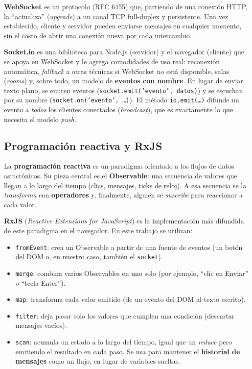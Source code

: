 \documentclass[12pt,a4paper]{article}
\begin{document}
\textbf{WebSocket} es un protocolo (RFC 6455) que, partiendo de una conexión HTTP, la ``actualiza'' (\textit{upgrade}) a un canal TCP full-duplex y persistente. Una vez establecido, cliente y servidor pueden enviarse mensajes en cualquier momento, sin el costo de abrir una conexión nueva por cada intercambio.

\textbf{Socket.io} es una biblioteca para Node.js (servidor) y el navegador (cliente) que se apoya en WebSocket y le agrega comodidades de uso real: reconexión automática, \textit{fallback} a otras técnicas si WebSocket no está disponible, salas (\textit{rooms}) y, sobre todo, un modelo de \textbf{eventos con nombre}. En lugar de enviar texto plano, se emiten eventos (\texttt{socket.emit('evento', datos)}) y se escuchan por su nombre (\texttt{socket.on('evento', \dots)}). El método \texttt{io.emit(\dots)} difunde un evento a \emph{todos} los clientes conectados (\textit{broadcast}), que es exactamente lo que necesita el modelo \textit{push}.

\subsection{Programación reactiva y RxJS}

La \textbf{programación reactiva} es un paradigma orientado a los flujos de datos asincrónicos. Su pieza central es el \textbf{Observable}: una secuencia de valores que llegan a lo largo del tiempo (clics, mensajes, ticks de reloj). A esa secuencia se la \emph{transforma} con \textbf{operadores} y, finalmente, alguien se \emph{suscribe} para reaccionar a cada valor.

\textbf{RxJS} (\textit{Reactive Extensions for JavaScript}) es la implementación más difundida de este paradigma en el navegador. En este trabajo se utilizan:
\begin{itemize}[leftmargin=1.4em]
    \item \texttt{fromEvent}: crea un Observable a partir de una fuente de eventos (un botón del DOM o, en nuestro caso, también el \texttt{socket}).
    \item \texttt{merge}: combina varios Observables en uno solo (por ejemplo, ``clic en Enviar'' \emph{o} ``tecla Enter'').
    \item \texttt{map}: transforma cada valor emitido (de un evento del DOM al texto escrito).
    \item \texttt{filter}: deja pasar solo los valores que cumplen una condición (descartar mensajes vacíos).
    \item \texttt{scan}: acumula un estado a lo largo del tiempo, igual que un \textit{reduce} pero emitiendo el resultado en cada paso. Se usa para mantener el \textbf{historial de mensajes} como un flujo, en lugar de variables sueltas.
\end{itemize}
\end{document}
